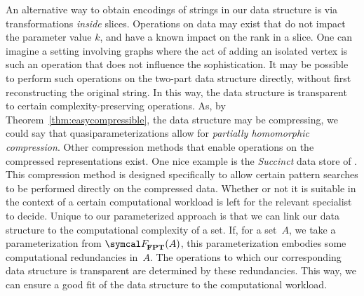 An alternative way to obtain encodings of strings in our data structure is via transformations \emph{inside} slices.
Operations on data may exist that do not impact the parameter value $k$, and have a known impact on the rank in a slice.
One can imagine a setting involving graphs where the act of adding an isolated vertex is such an operation that does not influence the sophistication.
It may be possible to perform such operations on the two-part data structure directly, without first reconstructing the original string.
In this way, the data structure is transparent to certain complexity-preserving operations.
As, by Theorem~\ref{thm:easycompressible}, the data structure may be compressing, we could say that quasiparameterizations allow for \emph{partially homomorphic compression}.
Other compression methods that enable operations on the compressed representations exist.
One nice example is the \emph{Succinct} data store of \textcite{agarwal2015succinct}.
This compression method is designed specifically to allow certain pattern searches to be performed directly on the compressed data.
Whether or not it is suitable in the context of a certain computational workload is left for the relevant specialist to decide.
Unique to our parameterized approach is that we can link our data structure to the computational complexity of a set.
If, for a set~$A$, we take a parameterization from $\calF_\cl{FPT}(A)$, this parameterization embodies some computational redundancies in~$A$.
The operations to which our corresponding data structure is transparent are determined by these redundancies.
This way, we can ensure a good fit of the data structure to the computational workload.

